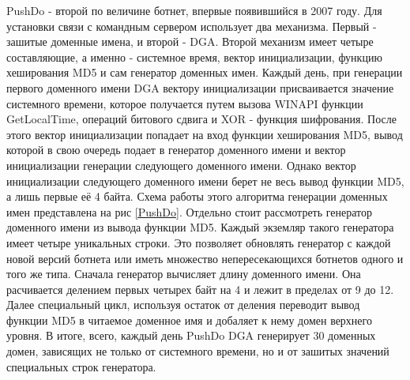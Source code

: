 PushDo - второй по величине ботнет, впервые появившийся в 2007 году. Для установки связи с командным сервером использует два механизма. Первый - зашитые доменные имена, и второй - DGA. Второй механизм имеет четыре составляющие, а именно - системное время, вектор инициализации, функцию хеширования MD5 и сам генератор доменных имен. Каждый день, при генерации первого доменного имени DGA вектору инициализации присваивается значение системного времени, которое получается путем вызова WINAPI функции GetLocalTime, операций битового сдвига и XOR - функция шифрования. После этого вектор инициализации попадает на вход функции хеширования MD5, вывод которой в свою очередь подает в генератор доменного имени и вектор инициализации генерации следующего доменного имени. Однако вектор инициализации следующего доменного имени берет не весь вывод функции MD5, а лишь первые её 4 байта. Схема работы этого алгоритма генерации доменных имен представлена на рис \ref{PushDo}.
Отдельно стоит рассмотреть генератор доменного имени из вывода функции MD5. Каждый экземляр такого генератора имеет четыре уникальных строки. Это позволяет обновлять генератор с каждой новой версий ботнета или иметь множество непересекающихся ботнетов одного и того же типа. Сначала генератор вычисляет длину доменного имени. Она расчивается делением первых четырех байт на 4 и лежит в пределах от 9 до 12. Далее специальный цикл, используя остаток от деления переводит вывод функции MD5 в читаемое доменное имя и добаляет к нему домен верхнего уровня. В итоге, всего, каждый день PushDo DGA генерирует 30 доменных домен, зависящих не только от системного времени, но и от зашитых значений специальных строк генератора.

